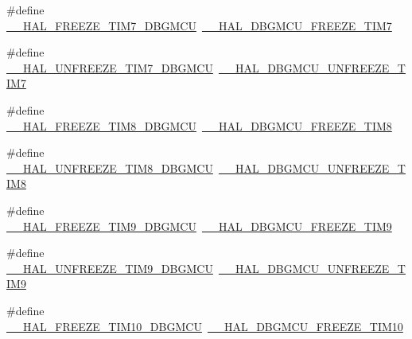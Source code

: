 \begin{DoxyCompactItemize}
\item 
\#define \hyperlink{group___h_a_l___d_b_g_m_c_u___aliased___macros_ga94b402c3740a7a996eb7a726ac88e76f}{\+\_\+\+\_\+\+H\+A\+L\+\_\+\+F\+R\+E\+E\+Z\+E\+\_\+\+T\+I\+M7\+\_\+\+D\+B\+G\+M\+CU}~\hyperlink{group___h_a_l___exported___macros_ga8541da9b4d428d41e218e9701e4307d1}{\+\_\+\+\_\+\+H\+A\+L\+\_\+\+D\+B\+G\+M\+C\+U\+\_\+\+F\+R\+E\+E\+Z\+E\+\_\+\+T\+I\+M7}
\item 
\#define \hyperlink{group___h_a_l___d_b_g_m_c_u___aliased___macros_gaa577c06b61b5993796a534133a453d98}{\+\_\+\+\_\+\+H\+A\+L\+\_\+\+U\+N\+F\+R\+E\+E\+Z\+E\+\_\+\+T\+I\+M7\+\_\+\+D\+B\+G\+M\+CU}~\hyperlink{group___h_a_l___exported___macros_ga4a6c5081b976583921ac5d140e15bb85}{\+\_\+\+\_\+\+H\+A\+L\+\_\+\+D\+B\+G\+M\+C\+U\+\_\+\+U\+N\+F\+R\+E\+E\+Z\+E\+\_\+\+T\+I\+M7}
\item 
\#define \hyperlink{group___h_a_l___d_b_g_m_c_u___aliased___macros_gad440cb28d99b94098bb778cb0768b0da}{\+\_\+\+\_\+\+H\+A\+L\+\_\+\+F\+R\+E\+E\+Z\+E\+\_\+\+T\+I\+M8\+\_\+\+D\+B\+G\+M\+CU}~\hyperlink{group___h_a_l___exported___macros_gaeee90b698bfc2421155265b4c5b43f09}{\+\_\+\+\_\+\+H\+A\+L\+\_\+\+D\+B\+G\+M\+C\+U\+\_\+\+F\+R\+E\+E\+Z\+E\+\_\+\+T\+I\+M8}
\item 
\#define \hyperlink{group___h_a_l___d_b_g_m_c_u___aliased___macros_gae4e7f5991a446063e45b7cfeb8e79ae4}{\+\_\+\+\_\+\+H\+A\+L\+\_\+\+U\+N\+F\+R\+E\+E\+Z\+E\+\_\+\+T\+I\+M8\+\_\+\+D\+B\+G\+M\+CU}~\hyperlink{group___h_a_l___exported___macros_ga7375cef18047e43c68f6bd871de40f1a}{\+\_\+\+\_\+\+H\+A\+L\+\_\+\+D\+B\+G\+M\+C\+U\+\_\+\+U\+N\+F\+R\+E\+E\+Z\+E\+\_\+\+T\+I\+M8}
\item 
\#define \hyperlink{group___h_a_l___d_b_g_m_c_u___aliased___macros_ga833593daa5d8571686e412f17d1f07f5}{\+\_\+\+\_\+\+H\+A\+L\+\_\+\+F\+R\+E\+E\+Z\+E\+\_\+\+T\+I\+M9\+\_\+\+D\+B\+G\+M\+CU}~\hyperlink{group___h_a_l___exported___macros_ga391a0780e10993d06c519addf582a438}{\+\_\+\+\_\+\+H\+A\+L\+\_\+\+D\+B\+G\+M\+C\+U\+\_\+\+F\+R\+E\+E\+Z\+E\+\_\+\+T\+I\+M9}
\item 
\#define \hyperlink{group___h_a_l___d_b_g_m_c_u___aliased___macros_ga83347551ffc6925558f8b279a5c87e95}{\+\_\+\+\_\+\+H\+A\+L\+\_\+\+U\+N\+F\+R\+E\+E\+Z\+E\+\_\+\+T\+I\+M9\+\_\+\+D\+B\+G\+M\+CU}~\hyperlink{group___h_a_l___exported___macros_ga3c336afea7d87b769cee4fb059ed2477}{\+\_\+\+\_\+\+H\+A\+L\+\_\+\+D\+B\+G\+M\+C\+U\+\_\+\+U\+N\+F\+R\+E\+E\+Z\+E\+\_\+\+T\+I\+M9}
\item 
\#define \hyperlink{group___h_a_l___d_b_g_m_c_u___aliased___macros_gaf3c4cd6fd3c210759028a7fe2625081e}{\+\_\+\+\_\+\+H\+A\+L\+\_\+\+F\+R\+E\+E\+Z\+E\+\_\+\+T\+I\+M10\+\_\+\+D\+B\+G\+M\+CU}~\hyperlink{group___h_a_l___exported___macros_gaee80dea9c85b61d2fb2499cbd97d8478}{\+\_\+\+\_\+\+H\+A\+L\+\_\+\+D\+B\+G\+M\+C\+U\+\_\+\+F\+R\+E\+E\+Z\+E\+\_\+\+T\+I\+M10}

\end{DoxyCompactItemize}
